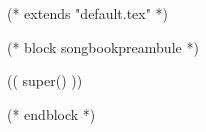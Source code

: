 (* extends "default.tex" *)

(* block songbookpreambule *)
   \usepackage[
     a4paper %
     ,includeheadfoot %
     ,hmarginratio=1:1 %
     ,outer=1.8cm %
     ,vmarginratio=1:1 %
     ,bmargin=1.3cm %
     ]{geometry}

  (( super() ))

   \pagestyle{empty}


   \renewcommand{\snumbgcolor}{SongNumberBgColor}
   \renewcommand{\notebgcolor}{NoteBgColor}
   \renewcommand{\idxbgcolor}{IndexBgColor}
(* endblock *)
